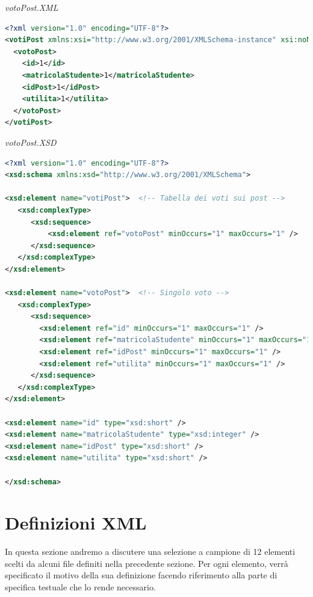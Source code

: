 \documentclass [a4paper,11pt]{book}
\begin{document}
\medskip

\emph{votoPost.XML}

\label{sec:votoPost}

\begin{lstlisting}[language=XML]
<?xml version="1.0" encoding="UTF-8"?>
<votiPost xmlns:xsi="http://www.w3.org/2001/XMLSchema-instance" xsi:noNamespaceSchemaLocation="votoPost.xsd">
  <votoPost>
    <id>1</id>
    <matricolaStudente>1</matricolaStudente>
    <idPost>1</idPost>
    <utilita>1</utilita>
  </votoPost>
</votiPost>
\end{lstlisting}

\emph{votoPost.XSD}

\begin{lstlisting}[language=XML]
<?xml version="1.0" encoding="UTF-8"?>
<xsd:schema xmlns:xsd="http://www.w3.org/2001/XMLSchema">

<xsd:element name="votiPost">  <!-- Tabella dei voti sui post -->
   <xsd:complexType> 
      <xsd:sequence>
	      <xsd:element ref="votoPost" minOccurs="1" maxOccurs="1" />
      </xsd:sequence>
   </xsd:complexType>
</xsd:element>

<xsd:element name="votoPost">  <!-- Singolo voto -->
   <xsd:complexType> 
      <xsd:sequence>
        <xsd:element ref="id" minOccurs="1" maxOccurs="1" /> 
        <xsd:element ref="matricolaStudente" minOccurs="1" maxOccurs="1" />
        <xsd:element ref="idPost" minOccurs="1" maxOccurs="1" /> 
        <xsd:element ref="utilita" minOccurs="1" maxOccurs="1" /> 
      </xsd:sequence>
   </xsd:complexType>
</xsd:element>

<xsd:element name="id" type="xsd:short" />
<xsd:element name="matricolaStudente" type="xsd:integer" />
<xsd:element name="idPost" type="xsd:short" />
<xsd:element name="utilita" type="xsd:short" />

</xsd:schema>
\end{lstlisting}

\medskip

\section{Definizioni XML}

In questa sezione andremo a discutere una selezione a campione di 12 elementi scelti da alcuni file definiti nella precedente sezione. Per ogni elemento, verrà specificato il motivo della sua definizione facendo riferimento alla parte di specifica testuale che lo rende necessario.
\end{document}

